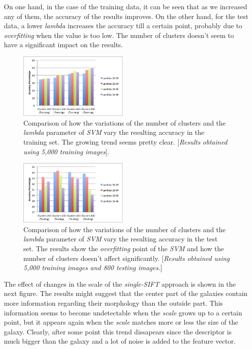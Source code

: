 \documentclass{vldb}
\begin{document}
On one hand, in the case of the training data, it can be seen that as we increased any of them, the accuracy of the results improves. On the other hand, for the test data, a lower \emph{lambda} increases the accuracy till a certain point, probably due to \emph{overfitting} when the value is too low. The number of clusters doesn't seem to have a significant impact on the results.

\begin{figure}[!ht]
    \centering
    \includegraphics[width=0.48\textwidth, trim=0 0 0 0, clip]{../Images/2_ClustersTraining.png}
    \caption{Comparison of how the variations of the number of clusters and the \emph{lambda} parameter of \emph{SVM} vary the resulting accuracy in the training set. The growing trend seems pretty clear. [\emph{Results obtained using 5,000 training images}].}
\end{figure}
\FloatBarrier

\begin{figure}[!ht]
    \centering
    \includegraphics[width=0.48\textwidth, trim=0 0 0 0, clip]{../Images/3_ClustersTesting.png}
    \caption{Comparison of how the variations of the number of clusters and the \emph{lambda} parameter of \emph{SVM} vary the resulting accuracy in the test set. The results show the \emph{overfitting} point of the \emph{SVM} and how the number of clusters doesn't affect significantly. [\emph{Results obtained using 5,000 training images and 800 testing images.}]}
\end{figure}
\FloatBarrier

The effect of changes in the scale of the \emph{single-SIFT} approach is shown in the next figure. The results might suggest that the center part of the galaxies contain more information regarding their morphology than the outside part. This information seems to become undetectable when the \emph{scale} grows up to a certain point, but it appears again when the \emph{scale} matches more or less the size of the galaxy. Clearly, after some point this trend dissapears since the descriptor is much bigger than the galaxy and a lot of noise is added to the feature vector.
\end{document}
